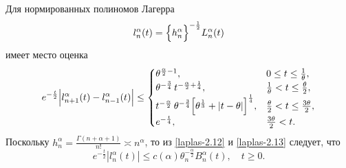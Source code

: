 Для нормированных полиномов Лагерра
\begin{equation}\label{laplas-2.13}
l_n^\alpha(t)=
\Bigl\{h_n^\alpha \Bigr\}^{-\frac{1}{2}} L_n^\alpha(t)
\end{equation}
имеет место оценка \cite{AskeyWaiger}
\begin{equation}\label{laplas-2.14}
e^{-\frac{t}{2}}
\Bigl|
l_{n+1}^\alpha(t)-
l_{n-1}^\alpha(t)
\Bigr|\le
\begin{cases}
\theta^{\frac{\alpha}{2}-1}, &0 \le t \le \frac{1}{\theta},\\
\theta^{-\frac{3}{4}}\,t^{-\frac{\alpha}{2} + \frac{1}{4}}, & \frac{1}{\theta} < t \le \frac{\theta}{2},\\
t^{-\frac{\alpha}{2}}\,
\theta^{-\frac{3}{4}}
\Bigl[
\theta^{\frac{1}{3}}+|t-\theta|
\Bigr]^{\frac{1}{4}}, & \frac{\theta}{2} < t \le \frac{3\theta}{2},\\
e^{-\frac{t}{4}}, &\frac{3\theta}{2}< t.
\end{cases}
\end{equation}
Поскольку $h_n^\alpha=\frac{\Gamma(n+\alpha+1)}{n!} \asymp n^\alpha$, то из \eqref{laplas-2.12} и \eqref{laplas-2.13} следует, что
\begin{equation}\label{laplas-2.15}
e^{-\frac{t}{2}}
|l_n^\alpha(t)|\le
c(\alpha)\theta_n^{-\frac{\alpha}{2}}B_n^\alpha(t), \quad t \ge 0.
\end{equation}


